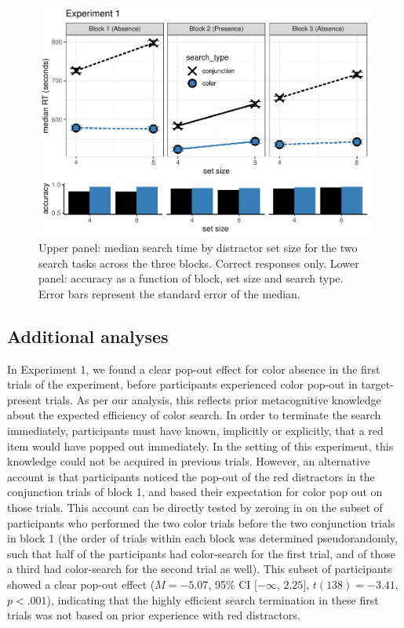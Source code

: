 \documentclass[
  english,
  man]{apa6}
\begin{document}
\begin{figure}[H]
\includegraphics[width=\textwidth]{termination_files/figure-latex/exp1Plot-1} \caption{Upper panel: median search time by distractor set size for the two search tasks across the three blocks. Correct responses only. Lower panel: accuracy as a function of block, set size and search type. Error bars represent the standard error of the median.}\label{fig:exp1Plot}
\end{figure}

\hypertarget{additional-analyses}{%
\subsection{Additional analyses}\label{additional-analyses}}

In Experiment 1, we found a clear pop-out effect for color absence in the first trials of the experiment, before participants experienced color pop-out in target-present trials. As per our analysis, this reflects prior metacognitive knowledge about the expected efficiency of color search. In order to terminate the search immediately, participants must have known, implicitly or explicitly, that a red item would have popped out immediately. In the setting of this experiment, this knowledge could not be acquired in previous trials. However, an alternative account is that participants noticed the pop-out of the red distractors in the conjunction trials of block 1, and based their expectation for color pop out on those trials. This account can be directly tested by zeroing in on the subset of participants who performed the two color trials before the two conjunction trials in block 1 (the order of trials within each block was determined pseudorandomly, such that half of the participants had color-search for the first trial, and of those a third had color-search for the second trial as well). This subset of participants showed a clear pop-out effect (\(M = -5.07\), 95\% CI \([-\infty\), \(2.25]\), \(t(138) = -3.41\), \(p < .001\)), indicating that the highly efficient search termination in these first trials was not based on prior experience with red distractors.
\end{document}

